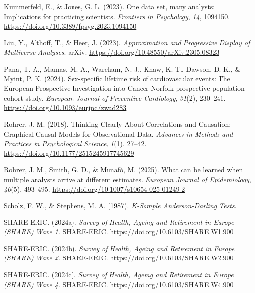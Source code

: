 \documentclass[
  man,
  floatsintext,
  longtable,
  nolmodern,
  notxfonts,
  notimes,
  colorlinks=true,linkcolor=blue,citecolor=blue,urlcolor=blue]{apa7}
\newlength{\cslhangindent}
\newenvironment{CSLReferences}[2] %
 {\begin{list}{}{%
  \setlength{\itemindent}{0pt}
  \setlength{\leftmargin}{0pt}
  \setlength{\parsep}{0pt}
  \ifodd #1
   \setlength{\leftmargin}{\cslhangindent}
   \setlength{\itemindent}{-1\cslhangindent}
  \fi
  \setlength{\itemsep}{#2\baselineskip}}}
 {\end{list}}
\begin{document}
\begin{CSLReferences}{1}{0}
Kummerfeld, E., \& Jones, G. L. (2023). One data set, many analysts:
{Implications} for practicing scientists. \emph{Frontiers in
Psychology}, \emph{14}, 1094150.
\url{https://doi.org/10.3389/fpsyg.2023.1094150}

Liu, Y., Althoff, T., \& Heer, J. (2023). \emph{Approximation and
{Progressive} {Display} of {Multiverse} {Analyses}}. arXiv.
\url{https://doi.org/10.48550/arXiv.2305.08323}

Pana, T. A., Mamas, M. A., Wareham, N. J., Khaw, K.-T., Dawson, D. K.,
\& Myint, P. K. (2024). Sex-specific lifetime risk of cardiovascular
events: The {European} {Prospective} {Investigation} into
{Cancer}-{Norfolk} prospective population cohort study. \emph{European
Journal of Preventive Cardiology}, \emph{31}(2), 230--241.
\url{https://doi.org/10.1093/eurjpc/zwad283}

Rohrer, J. M. (2018). Thinking {Clearly} {About} {Correlations} and
{Causation}: {Graphical} {Causal} {Models} for {Observational} {Data}.
\emph{Advances in Methods and Practices in Psychological Science},
\emph{1}(1), 27--42. \url{https://doi.org/10.1177/2515245917745629}

Rohrer, J. M., Smith, G. D., \& Munafò, M. (2025). What can be learned
when multiple analysts arrive at different estimates. \emph{European
Journal of Epidemiology}, \emph{40}(5), 493--495.
\url{https://doi.org/10.1007/s10654-025-01249-2}

Scholz, F. W., \& Stephens, M. A. (1987). \emph{K-{Sample}
{Anderson}-{Darling} {Tests}}.

SHARE-ERIC. (2024a). \emph{Survey of {Health}, {Ageing} and {Retirement}
in {Europe} ({SHARE}) {Wave} 1}. SHARE-ERIC.
\url{https://doi.org/10.6103/SHARE.W1.900}

SHARE-ERIC. (2024b). \emph{Survey of {Health}, {Ageing} and {Retirement}
in {Europe} ({SHARE}) {Wave} 2}. SHARE-ERIC.
\url{https://doi.org/10.6103/SHARE.W2.900}

SHARE-ERIC. (2024c). \emph{Survey of {Health}, {Ageing} and {Retirement}
in {Europe} ({SHARE}) {Wave} 4}. SHARE-ERIC.
\url{https://doi.org/10.6103/SHARE.W4.900}


\end{CSLReferences}
\end{document}
